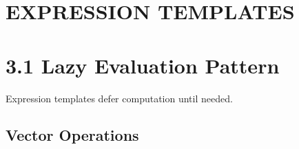 \hypertarget{expression-templates}{%
\section{EXPRESSION TEMPLATES}\label{expression-templates}}

\hypertarget{lazy-evaluation-pattern}{%
\section{3.1 Lazy Evaluation Pattern}\label{lazy-evaluation-pattern}}

Expression templates defer computation until needed.

\hypertarget{vector-operations}{%
\subsection{Vector Operations}\label{vector-operations}}

